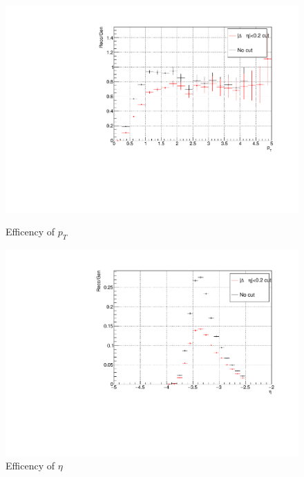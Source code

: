                 \begin{figure}[htbp]
                    \centering
                    \begin{minipage}{0.45\textwidth}
                        \centering
                        \includegraphics[width=\textwidth]{fig/3_5_6_efficiency_pt.pdf}
                        \captionsetup{labelformat=empty}
                        \caption{Efficency of $p_T$}
                    \end{minipage}
                    \hfill
                    \begin{minipage}{0.45\textwidth}
                    \centering
                        \includegraphics[width=\textwidth]{fig/3_5_6_efficiency_eta.pdf}
                        \captionsetup{labelformat=empty}
                        \caption{Efficency of $\eta$}

\end{minipage}
\end{figure}
